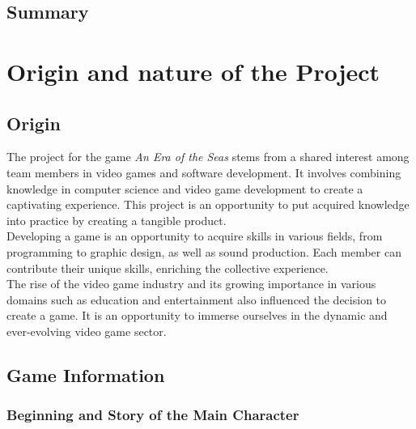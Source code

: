 \documentclass{article}
\begin{document}
\newpage
\subsection*{Summary}
\tableofcontents















\newpage
\section{Origin and nature of the Project}
\subsection{Origin}\hfill

The project for the game \textit{An Era of the Seas} stems from a shared interest among team members in video games and software development. It involves combining knowledge in computer science and video game development to create a captivating experience. This project is an opportunity to put acquired knowledge into practice by creating a tangible product.\\

Developing a game is an opportunity to acquire skills in various fields, from programming to graphic design, as well as sound production. Each member can contribute their unique skills, enriching the collective experience.\\

The rise of the video game industry and its growing importance in various domains such as education and entertainment also influenced the decision to create a game. It is an opportunity to immerse ourselves in the dynamic and ever-evolving video game sector.















\subsection{Game Information} 
\subsubsection{Beginning and Story of the Main Character}\hfill
\end{document}
